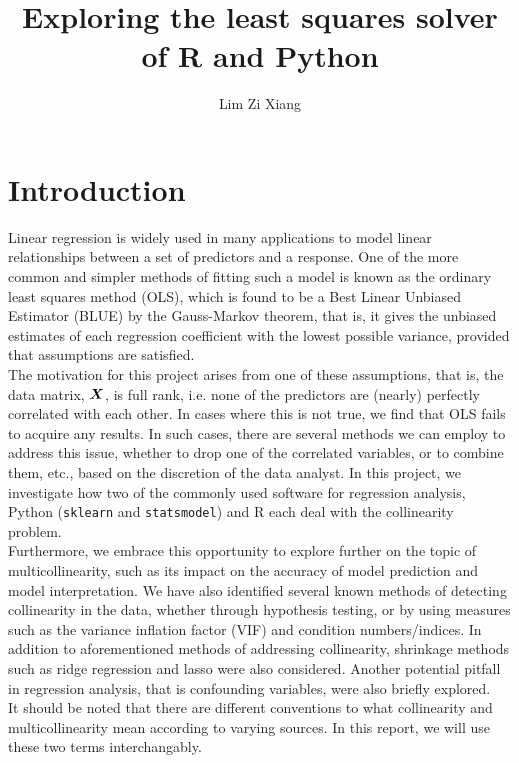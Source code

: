 \documentclass[12pt]{article}
\title{Exploring the least squares solver of R and Python}
\author{Lim Zi Xiang}
\date{}
\begin{document}
	\tableofcontents
	\pagebreak
	
	\section{Introduction}
	
	Linear regression is widely used in many applications to model linear relationships between a set of predictors and a response. One of the more common and simpler methods of fitting such a model is known as the ordinary least squares method (OLS), which is found to be a Best Linear Unbiased Estimator (BLUE) by the Gauss-Markov theorem, that is, it gives the unbiased estimates of each regression coefficient with the lowest possible variance, provided that assumptions are satisfied. \\
	
	\setlength\parindent{24pt} The motivation for this project arises from one of these assumptions, that is, the data matrix, $\boldsymbol{X}$, is full rank, i.e. none of the predictors are (nearly) perfectly correlated with each other. In cases where this is not true, we find that OLS fails to acquire any results. In such cases, there are several methods we can employ to address this issue, whether to drop one of the correlated variables, or to combine them, etc., based on the discretion of the data analyst. In this project, we investigate how two of the commonly used software for regression analysis, Python (\texttt{sklearn} and \texttt{statsmodel}) and R each deal with the collinearity problem.\\
	
	Furthermore, we embrace this opportunity to explore further on the topic of multicollinearity, such as its impact on the accuracy of model prediction and model interpretation. We have also identified several known methods of detecting collinearity in the data, whether through hypothesis testing, or by using measures such as the variance inflation factor (VIF) and condition numbers/indices. In addition to aforementioned methods of addressing collinearity, shrinkage methods such as ridge regression and lasso were also considered. Another potential pitfall in regression analysis, that is confounding variables, were also briefly explored.\\
	
	It should be noted that there are different conventions to what collinearity and multicollinearity mean according to varying sources. In this report, we will use these two terms interchangably.
	
\end{document}
